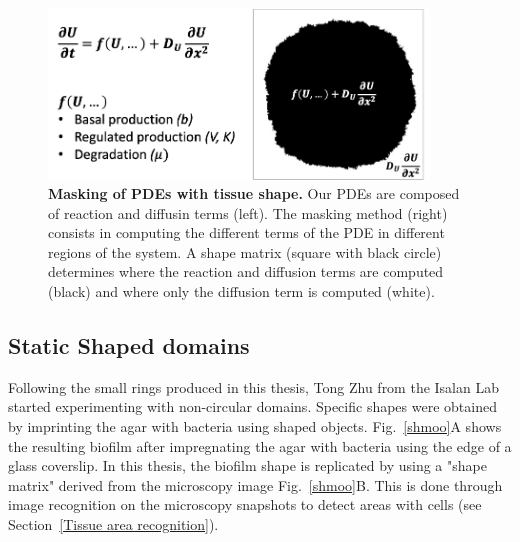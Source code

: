 \begin{figure}[H]
    \centering

    \includegraphics[width=0.9\textwidth]{chapters/Chapter 3/mask}
    \caption{\textbf{Masking of PDEs with tissue shape.} Our PDEs are composed of reaction and diffusin terms (left). The masking method (right) consists in computing the different terms of the PDE in different regions of the system. A shape matrix (square with black circle) determines where the reaction and diffusion terms are computed (black) and where only the diffusion term is computed (white).}
    \label{mask}
\end{figure}

\subsection{Static Shaped domains}
Following the small rings produced in this thesis, Tong Zhu from the Isalan Lab started experimenting with non-circular domains.
Specific shapes were obtained by imprinting the agar with bacteria using shaped objects.
Fig.~\ref{shmoo}A shows the resulting biofilm after impregnating the agar with bacteria using the edge of a glass coverslip.
In this thesis, the biofilm shape is replicated by using a "shape matrix" derived from the microscopy image Fig.~\ref{shmoo}B.
This is done through image recognition on the microscopy snapshots to detect areas with cells (see Section~\ref{Tissue area recognition}).


